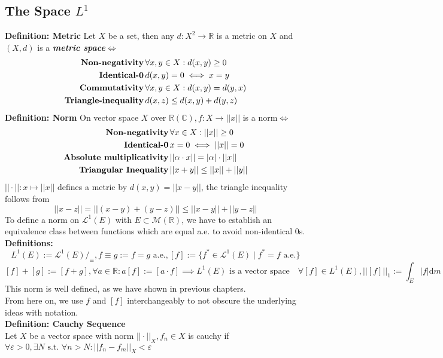 \documentclass{article}
\newcommand{\C}{\mathbb{C}}
\newcommand{\R}{\mathbb{R}}
\newcommand{\st}{\mbox{ s.t. }}
\newcommand{\0}{{\bf{0}}}
\newcommand{\1}{{\bf{1}}}
\newcommand{\alev}{\mbox{ a.e.}}
\newcommand{\dif}{\mbox{d}}
\begin{document}
\subsection{The Space $L^1$}
\textbf{Definition: Metric}
Let $X$ be a set, then any $d:X^2\to\R$ is a metric on $X$ and $(X,d)$ is a \textit{\textbf{metric space}}$\iff$
\begin{equation}
\begin{split}
    \mbox{\textbf{Non-negativity}}\,&\forall x,y\in X:d(x,y)\geq0\\
    \mbox{\textbf{Identical-0}}\,&d(x,y)=0\iff x=y\\
    \mbox{\textbf{Commutativity}}\,&\forall x,y\in X:d(x,y)=d(y,x)\\
    \mbox{\textbf{Triangle-inequality}}\,&d(x,z)\le d(x,y)+d(y,z)
\end{split}
\end{equation}
\textbf{Definition: Norm}
On vector space $X$ over $\R(\C),f:X\to||x||$ is a norm$\iff$
\begin{equation}
\begin{split}
    \mbox{\textbf{Non-negativity}}&\,\forall x\in X:||x||\geq0\\
    \mbox{\textbf{Identical-0}}&\,x=0\iff||x||=0\\
    \mbox{\textbf{Absolute multiplicativity}}&\,||\alpha\cdot x||=|\alpha|\cdot||x||\\
    \mbox{\textbf{Triangular Inequality}}&\,||x+y||\le||x||+||y||
\end{split}
\end{equation}
$||\cdot||:x\mapsto||x||$ defines a metric by $d(x,y)=||x-y||$, the triangle inequality follows from
$$||x-z||=||(x-y)+(y-z)||\le||x-y||+||y-z||$$
To define a norm on $\mathcal{L}^1(E)$ with $E\subset\mathcal{M}(\R)$, we have to establish an equivalence class between functions which are equal a.e. to avoid non-identical 0s.\\
\textbf{Definitions:} $$L^1(E):=\mathcal{L}^1(E)/_\equiv,f\equiv g:=f=g\alev,[f]:=\{f^*\in\mathcal{L}^1(E)\mid f^*=f\alev\}$$
$$[f]+[g]:=[f+g],\forall a\in\R:a[f]:=[a\cdot f]\implies L^1(E)\mbox{ is a vector space}\quad\forall[f]\in L^1(E),||[f]||_1:=\int_E|f|\dif m$$
This norm is well defined, as we have shown in previous chapters.\\
From here on, we use $f$ and $[f]$ interchangeably to not obscure the underlying ideas with notation.\\
\textbf{Definition: Cauchy Sequence}\\
Let $X$ be a vector space with norm $||\cdot||_X,f_n\in X$ is cauchy if $\forall\varepsilon>0,\exists N\st\forall n>N:||f_n-f_m||_X<\varepsilon$\\
\end{document}
